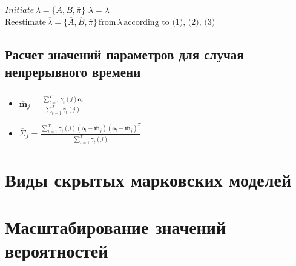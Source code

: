 \documentclass{beamer}
\begin{document}
\begin{frame}
  \frametitle{\insertsection}
  \framesubtitle{\insertsubsection}

  \begin{algorithm}[H]
    \begin{algorithmic}[1]
      \State $ Initiate \, \overline{\lambda} = \{\overline{A}, \overline{B}, \overline{\pi} \}$
      \Do
      \State $ \lambda = \overline{\lambda}$
      \State $ \text{Reestimate} \, \overline{\lambda} = \{\overline{A}, \overline{B}, \overline{\pi}\} \, \text{from} \, \lambda \, \text{according to (1), (2), (3)} $
      \doWhile{$|\overline{\lambda} - \lambda| < \epsilon$}
    \end{algorithmic}
  \end{algorithm}

\end{frame}


\subsection{Расчет значений параметров для случая непрерывного времени}

\begin{frame}
  \frametitle{\insertsection}
  \framesubtitle{\insertsubsection}

  \begin{itemize}
  \item $\displaystyle \overline{\mathbf{m}}_j = \frac{\sum_{t = 1}^{T} \gamma_t(j) \mathbf{o}_t}{\sum_{t = 1}^{T} \gamma_t(j)}$

  \item $\displaystyle \overline{\Sigma}_j = \frac{\sum_{t = 1}^{T} \gamma_t(j) (\mathbf{o}_t - \overline{\mathbf{m}}_j)(\mathbf{o}_t - \overline{\mathbf{m}}_j)^T}{\sum_{t = 1}^{T} \gamma_t(j)}$
  \end{itemize}

\end{frame}

\section{Виды скрытых марковских моделей}

\section{Масштабирование значений вероятностей}
\end{document}
